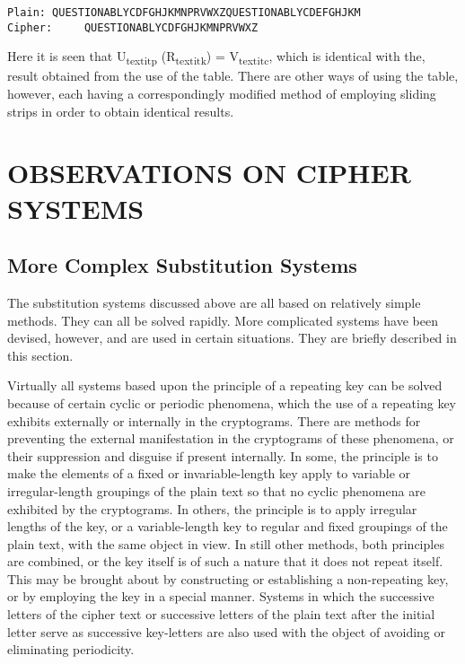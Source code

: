 \begin{verbatim}
Plain: QUESTIONABLYCDFGHJKMNPRVWXZQUESTIONABLYCDEFGHJKM
Cipher:     QUESTIONABLYCDFGHJKMNPRVWXZ
\end{verbatim}

Here it is seen that U\textsubscript{textit{p}} (R\textsubscript{textit{k}}) = V\textsubscript{textit{c}}, which is identical with the, result
obtained from the use of the table. There are other ways of using the
table, however, each having a correspondingly modiﬁed method of employing sliding strips in order to obtain identical results.

\section{OBSERVATIONS ON CIPHER SYSTEMS}

\subsection{More Complex Substitution Systems}

\mypara The substitution systems discussed above are all based on relatively
simple methods. They can all be solved rapidly. More complicated systems have been devised, however, and are used in certain situations.
They are brieﬂy described in this section.

\mypara Virtually all systems based upon the principle of a repeating key
can be solved because of certain cyclic or periodic phenomena, which the
use of a repeating key exhibits externally or internally in the cryptograms. There are methods for preventing the external manifestation in
the cryptograms of these phenomena, or their suppression and disguise
if present internally. In some, the principle is to make the elements of a
ﬁxed or invariable-length key apply to variable or irregular-length groupings of the plain text so that no cyclic phenomena are exhibited by the
cryptograms. In others, the principle is to apply irregular lengths of the
key, or a variable-length key to regular and ﬁxed groupings of the plain
text, with the same object in view. In still other methods, both principles
are combined, or the key itself is of such a nature that it does not repeat
itself. This may be brought about by constructing or establishing a non-repeating key, or by employing the key in a special manner. Systems in
which the successive letters of the cipher text or successive letters of the
plain text after the initial letter serve as successive key-letters are also
used with the object of avoiding or eliminating periodicity.

